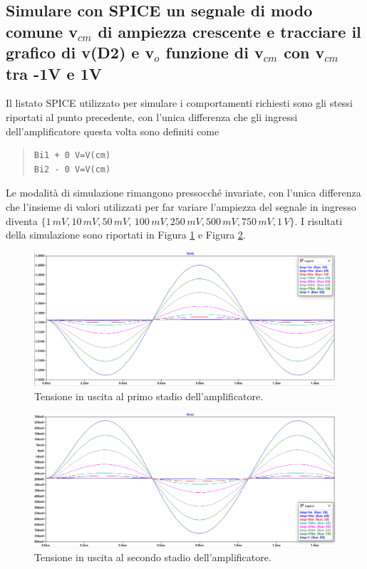 \documentclass[a4paper,10pt]{article}
\begin{document}
\subsection{Simulare con SPICE un segnale di modo comune v$_{cm}$ di ampiezza crescente e tracciare il grafico di v(D2) e v$_o$ funzione di v$_{cm}$ con v$_{cm}$ tra -1V e 1V}
Il listato SPICE utilizzato per simulare i comportamenti richiesti sono gli stessi riportati al punto precedente, con l'unica differenza che gli ingressi dell'amplificatore questa volta sono definiti come
\begin{quote}
\begin{verbatim}
Bi1 + 0 V=V(cm)
Bi2 - 0 V=V(cm)
\end{verbatim}
\end{quote}
Le modalità di simulazione rimangono pressocché invariate, con l'unica differenza che l'insieme di valori utilizzati per far variare l'ampiezza del segnale in ingresso diventa $\{1\, mV, 10\, mV, 50\, mV$, $100\, mV, 250\, mV, 500\, mV, 750\, mV, 1\, V \}$. I risultati della simulazione sono riportati in Figura \ref{fig:vcmv4} e Figura \ref{fig:vcmvo}.\\
\begin{figure}[h!]
  	\centering
 	\includegraphics[width=0.9\linewidth]{es1-6-n4.png}
  	\caption{Tensione in uscita al primo stadio dell'amplificatore.}
  	\label{fig:vcmv4}
\end{figure}
\begin{figure}[h!]
  	\centering
 	\includegraphics[width=0.9\linewidth]{es1-6-out.png}
  	\caption{Tensione in uscita al secondo stadio dell'amplificatore.}
  	\label{fig:vcmvo}
\end{figure}
\end{document}
